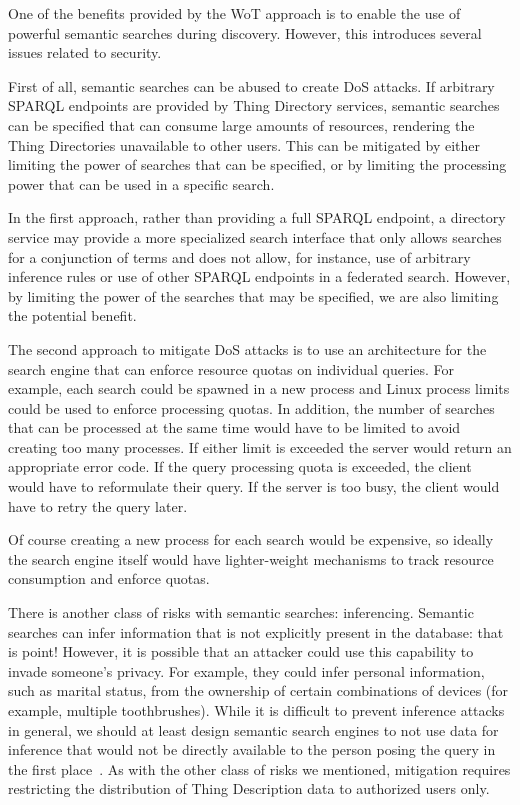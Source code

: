One of the benefits provided by the WoT approach is to
enable the use of powerful semantic searches during discovery.
However, this introduces several issues related to security.

First of all, semantic searches can be abused to create DoS attacks.
If arbitrary SPARQL endpoints are provided by Thing Directory
services, semantic searches can be specified
that can consume large amounts of resources,
rendering the Thing Directories unavailable to other users.
This can be mitigated by either limiting the power of searches
that can be specified, or by limiting the processing
power that can be used in a specific search.

In the first approach, rather than providing a full
SPARQL endpoint, a directory service may provide a more specialized
search interface that only allows searches for a conjunction of terms
and does not allow, for instance, use of arbitrary inference rules
or use of other SPARQL endpoints in a federated search.
However, by limiting the power
of the searches that may be specified, we are also limiting the
potential benefit.

The second approach to mitigate DoS attacks 
is to use an architecture for the 
search engine that can enforce resource quotas on individual queries.
For example, each search could be spawned in a new process and Linux
process limits could be used to enforce processing quotas. In addition,
the number of searches that can be processed at the same time would
have to be limited to avoid creating too many processes.
If either limit is exceeded the server would return an appropriate
error code.  If the query processing quota is exceeded, the client
would have to reformulate their query.  If the server is too busy,
the client would have to retry the query later.

Of course creating a new process for each search would be expensive,
so ideally the search engine itself would have lighter-weight
mechanisms to track resource consumption and enforce quotas.

There is another class of risks with semantic searches: 
inferencing.  Semantic searches can infer information that is
not explicitly present in the database: that is point!
However, it is possible that an attacker could use this capability
to invade someone's privacy.  For example, they could infer
personal information, such as marital status, from the ownership
of certain combinations of devices (for example, multiple toothbrushes).
While it is difficult to prevent inference attacks in general,
we should at least design semantic search engines to not use 
data for inference that would not be directly available to the
person posing the query in the first place~\cite{Thura2005a,Xia2014a}.  
As with the other class of risks we mentioned,
mitigation requires restricting the distribution of Thing Description
data to authorized users only.
